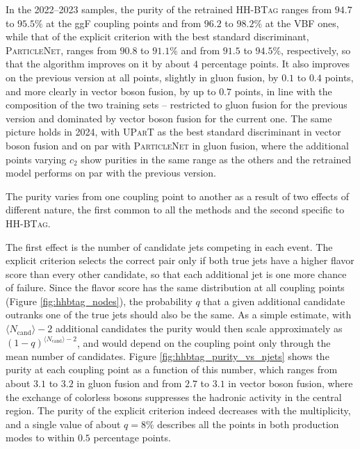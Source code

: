 In the 2022--2023 samples, the purity of the retrained \textsc{HH-BTag} ranges from $94.7$ to $95.5\%$ at the ggF coupling points and from $96.2$ to $98.2\%$ at the VBF ones, while that of the explicit criterion with the best standard discriminant, \textsc{ParticleNet}, ranges from $90.8$ to $91.1\%$ and from $91.5$ to $94.5\%$, respectively, so that the algorithm improves on it by about $4$ percentage points. It also improves on the previous version at all points, slightly in gluon fusion, by $0.1$ to $0.4$ points, and more clearly in vector boson fusion, by up to $0.7$ points, in line with the composition of the two training sets -- restricted to gluon fusion for the previous version and dominated by vector boson fusion for the current one. The same picture holds in 2024, with \textsc{UParT} as the best standard discriminant in vector boson fusion and on par with \textsc{ParticleNet} in gluon fusion, where the additional points varying $c_2$ show purities in the same range as the others and the retrained model performs on par with the previous version.

The purity varies from one coupling point to another as a result of two effects of different nature, the first common to all the methods and the second specific to \textsc{HH-BTag}.

The first effect is the number of candidate jets competing in each event. The explicit criterion selects the correct pair only if both true jets have a higher flavor score than every other candidate, so that each additional jet is one more chance of failure. Since the flavor score has the same distribution at all coupling points (Figure \ref{fig:hhbtag_nodes}), the probability $q$ that a given additional candidate outranks one of the true jets should also be the same. As a simple estimate, with $\langle N_\text{cand}\rangle - 2$ additional candidates the purity would then scale approximately as $(1-q)^{\langle N_\text{cand}\rangle - 2}$, and would depend on the coupling point only through the mean number of candidates. Figure \ref{fig:hhbtag_purity_vs_njets} shows the purity at each coupling point as a function of this number, which ranges from about $3.1$ to $3.2$ in gluon fusion and from $2.7$ to $3.1$ in vector boson fusion, where the exchange of colorless bosons suppresses the hadronic activity in the central region. The purity of the explicit criterion indeed decreases with the multiplicity, and a single value of about $q = 8\%$ describes all the points in both production modes to within $0.5$ percentage points.


